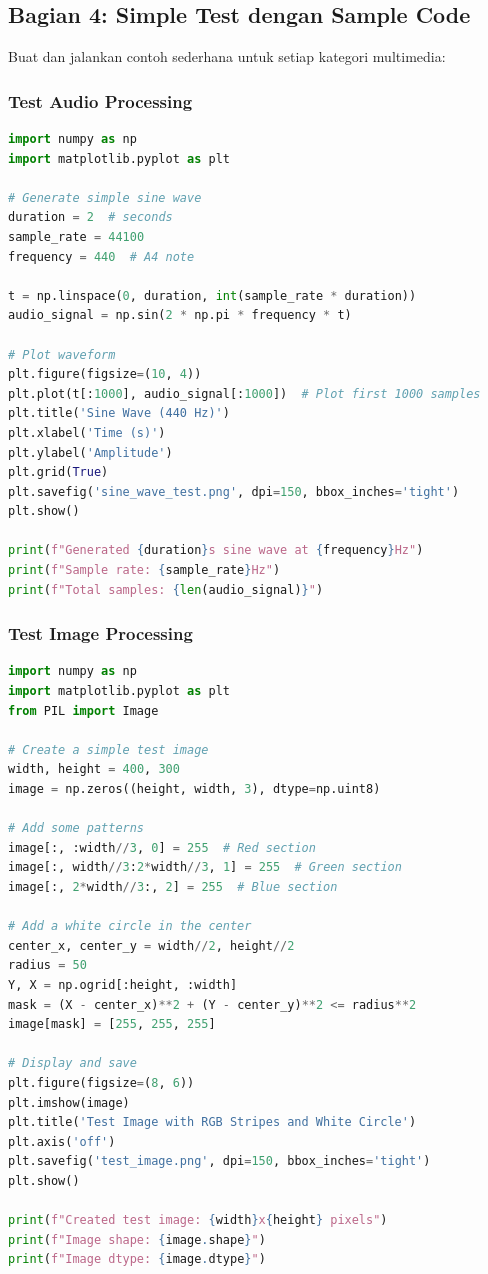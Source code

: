 \documentclass[11pt,a4paper]{article}
\begin{document}
\subsection{Bagian 4: Simple Test dengan Sample Code}
Buat dan jalankan contoh sederhana untuk setiap kategori multimedia:


\subsubsection{Test Audio Processing}
\begin{lstlisting}[language=Python, caption=Test audio processing sederhana]
import numpy as np
import matplotlib.pyplot as plt

# Generate simple sine wave
duration = 2  # seconds
sample_rate = 44100
frequency = 440  # A4 note

t = np.linspace(0, duration, int(sample_rate * duration))
audio_signal = np.sin(2 * np.pi * frequency * t)

# Plot waveform
plt.figure(figsize=(10, 4))
plt.plot(t[:1000], audio_signal[:1000])  # Plot first 1000 samples
plt.title('Sine Wave (440 Hz)')
plt.xlabel('Time (s)')
plt.ylabel('Amplitude')
plt.grid(True)
plt.savefig('sine_wave_test.png', dpi=150, bbox_inches='tight')
plt.show()

print(f"Generated {duration}s sine wave at {frequency}Hz")
print(f"Sample rate: {sample_rate}Hz")
print(f"Total samples: {len(audio_signal)}")
\end{lstlisting}

\subsubsection{Test Image Processing}
\begin{lstlisting}[language=Python, caption=Test image processing sederhana]
import numpy as np
import matplotlib.pyplot as plt
from PIL import Image

# Create a simple test image
width, height = 400, 300
image = np.zeros((height, width, 3), dtype=np.uint8)

# Add some patterns
image[:, :width//3, 0] = 255  # Red section
image[:, width//3:2*width//3, 1] = 255  # Green section
image[:, 2*width//3:, 2] = 255  # Blue section

# Add a white circle in the center
center_x, center_y = width//2, height//2
radius = 50
Y, X = np.ogrid[:height, :width]
mask = (X - center_x)**2 + (Y - center_y)**2 <= radius**2
image[mask] = [255, 255, 255]

# Display and save
plt.figure(figsize=(8, 6))
plt.imshow(image)
plt.title('Test Image with RGB Stripes and White Circle')
plt.axis('off')
plt.savefig('test_image.png', dpi=150, bbox_inches='tight')
plt.show()

print(f"Created test image: {width}x{height} pixels")
print(f"Image shape: {image.shape}")
print(f"Image dtype: {image.dtype}")
\end{lstlisting}
\end{document}
